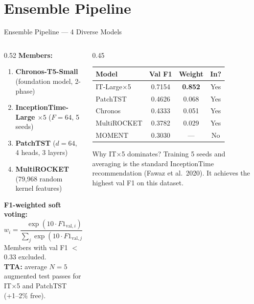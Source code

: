 \documentclass[aspectratio=169, 10pt]{beamer}
\begin{document}
\section{Ensemble Pipeline}

\begin{frame}{Ensemble Pipeline — 4 Diverse Models}
  \begin{columns}
    \begin{column}{0.52\textwidth}
      \textbf{Members:}
      \begin{enumerate}
        \item \textcolor{myblue}{\textbf{Chronos-T5-Small}} (foundation model, 2-phase)
        \item \textbf{InceptionTime-Large $\times 5$} ($F=64$, 5 seeds)
        \item \textbf{PatchTST} ($d=64$, 4 heads, 3 layers)
        \item \textbf{MultiROCKET} (79,968 random kernel features)
      \end{enumerate}
      \vspace{0.4em}
      \textbf{F1-weighted soft voting:}
      $$w_i = \frac{\exp(10 \cdot F1_{\text{val},i})}{\sum_j \exp(10 \cdot F1_{\text{val},j})}$$
      Members with val F1 $<$ 0.33 excluded.\\[0.4em]
      \textbf{TTA:} average $N=5$ augmented test passes
      for IT$\times$5 and PatchTST (+1--2\% free).
    \end{column}
    \begin{column}{0.45\textwidth}
      \begin{center}
      \footnotesize
      \begin{tabular}{lccc}
        \toprule
        Model & Val F1 & Weight & In? \\
        \midrule
        IT-Large$\times$5  & 0.7154 & \textbf{0.852} & \textcolor{mygreen}{Yes} \\
        PatchTST           & 0.4626 & 0.068 & \textcolor{mygreen}{Yes} \\
        \textcolor{myblue}{Chronos} & \textcolor{myblue}{0.4333} & 0.051 & \textcolor{mygreen}{Yes} \\
        MultiROCKET        & 0.3782 & 0.029 & \textcolor{mygreen}{Yes} \\
        MOMENT             & 0.3030 & — & \textcolor{myred}{No} \\
        \bottomrule
      \end{tabular}
      \end{center}
      \vspace{0.4em}
      \begin{block}{Why IT$\times$5 dominates?}
        \small Training 5 seeds and averaging is the standard
        InceptionTime recommendation (Fawaz et al.\ 2020).
        It achieves the highest val F1 on this dataset.
      \end{block}
    \end{column}
  \end{columns}
\end{frame}
\end{document}

